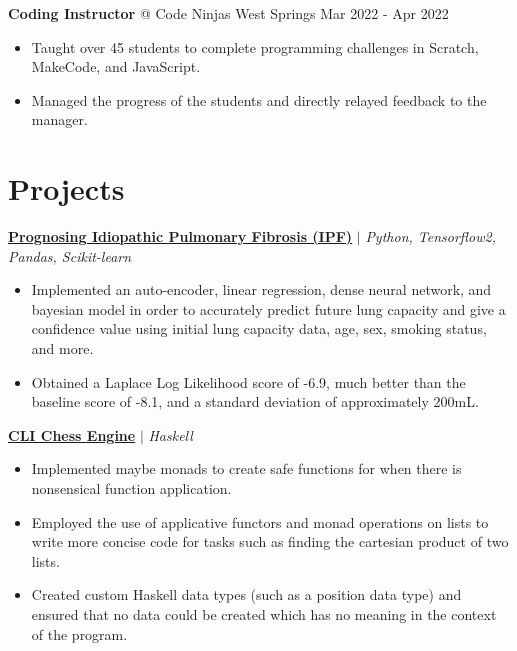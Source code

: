 \documentclass{article}
\makeatletter
\newcommand{\smallbullet}{\,\begin{picture}(-1,1)(-1,-3)\circle*{3}\end{picture}\ }
\newenvironment{resumeItem}
{
    \vspace{0.5em}
}
{
}
\newcommand{\projectHead}[3]{
    \textbf{#1} $\vert$ \textit{#2} \\[-1.2em]
}
\newcommand{\experienceHead}[4]{
    \textbf{#1} @ #2 \hfill #3 \\[-1.2em]
}
\newenvironment{resumeList}
{
    \begin{itemize}[label=\smallbullet]
}
{
    \end{itemize}
}
\makeatother
\begin{document}
\begin{resumeItem}
\experienceHead{Coding Instructor}{Code Ninjas West Springs}{Mar 2022 - Apr 2022}{Calgary, AB.}
\begin{resumeList}
    \item Taught over 45 students to complete programming challenges in Scratch, MakeCode, and JavaScript.
    \item Managed the progress of the students and directly relayed feedback to the manager.
\end{resumeList}
\end{resumeItem}


\section{Projects}

\begin{resumeItem}
\projectHead{\href{https://github.com/arnavcs/OSIC-IPF}{Prognosing Idiopathic Pulmonary Fibrosis (IPF)}}{Python, Tensorflow2, Pandas, Scikit-learn}{Dec 2020 - Jun 2021}
\begin{resumeList}
    \item Implemented an auto-encoder, linear regression, dense neural network, and bayesian model in order to accurately predict future lung capacity and give a confidence value using initial lung capacity data, age, sex, smoking status, and more.
    \item Obtained a Laplace Log Likelihood score of -6.9, much better than the baseline score of -8.1, and a standard deviation of approximately 200mL.
\end{resumeList}
\end{resumeItem}

\begin{resumeItem}
\projectHead{\href{https://github.com/arnavcs/cli-chess-engine}{CLI Chess Engine}}{Haskell}{Aug 2022 - Present}
\begin{resumeList}
    \item Implemented maybe monads to create safe functions for when there is nonsensical function application.
    \item Employed the use of applicative functors and monad operations on lists to write more concise code for tasks such as finding the cartesian product of two lists.
    \item Created custom Haskell data types (such as a position data type) and ensured that no data could be created which has no meaning in the context of the program.
\end{resumeList}
\end{resumeItem}
\end{document}
